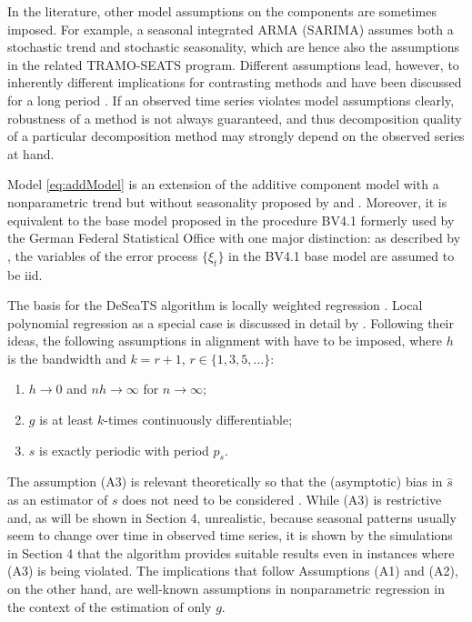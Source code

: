 In the literature, other model assumptions on the components are sometimes imposed. For example, a seasonal integrated ARMA (SARIMA) assumes both a stochastic trend and stochastic seasonality, which are hence also the assumptions in the related TRAMO-SEATS program. Different assumptions lead, however, to inherently different implications for contrasting methods and have been discussed for a long period \citep{pierce_1978, dejong_et_al_1992}. If an observed time series violates model assumptions clearly, robustness of a method is not always guaranteed, and thus decomposition quality of a particular decomposition method may strongly depend on the observed series at hand.

Model \eqref{eq:addModel} is an extension of the additive component model with a nonparametric trend but without seasonality proposed by \citet{feng2020datadriven} and \citet{feng2022smoots}. Moreover, it is equivalent to the base model proposed in the procedure BV4.1 formerly used by the German Federal Statistical Office with one major distinction: as described by \citet{speth2004komponentenzerlegung}, the variables of the error process \(\{\xi_t\}\) in the BV4.1 base model are assumed to be iid.

The basis for the DeSeaTS algorithm is locally weighted regression \citep{cleveland1979robust}. Local polynomial regression as a special case is discussed in detail by \citet{fan1996local}. Following their ideas, the following assumptions in alignment with \citet{feng2013seasonal} have to be imposed, where \(h\) is the bandwidth and \(k=r+1\), \(r\in\{1,3,5,\dots\}\):

\begin{enumerate}  \item[(A1)] $h\rightarrow 0$ and $nh\rightarrow \infty$ for $n\rightarrow \infty$;
  \item[(A2)] $g$ is at least $k$-times continuously differentiable;
  \item[(A3)] $s$ is exactly periodic with period $p_s$.
\end{enumerate}

\noindent
The assumption (A3) is relevant theoretically so that the (asymptotic) bias in \(\hat s\) as an estimator of \(s\) does not need to be considered \citep{feng2013seasonal}. While (A3) is restrictive and, as will be shown in Section 4, unrealistic, because seasonal patterns usually seem to change over time in observed time series, it is shown by the simulations in Section 4 that the algorithm provides suitable results even in instances where (A3) is being violated. The implications that follow Assumptions (A1) and (A2), on the other hand, are well-known assumptions in nonparametric regression in the context of the estimation of only \(g\).

